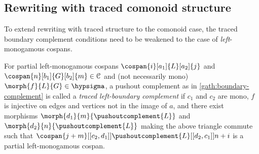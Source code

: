\subsection{Rewriting with traced comonoid structure}

To extend rewriting with traced structure to the comonoid case, the traced
boundary complement conditions need to be weakened to the case of
\emph{left}-monogamous cospans.

\begin{definition}
    \label{def:traced-left-boundary-complement}
    For partial left-monogamous cospans \(
        \cospan{i}[a_1]{L}[a_2]{j}
    \) and \(
        \cospan{n}[b_1]{G}[b_2]{m} \in \mathcal{C}
    \) and (not necessarily mono) \(
        \morph{f}{L}{G} \in \hypsigma
    \), a pushout complement as in \cref{gath:boundary-complement}
    is called a \emph{traced left-boundary complement} if \(c_1\) and \(c_2\)
    are mono, \(f\) is injective on edges and vertices not in the image of
    \(a\), and there exist morphisms \(
        \morph{d_1}{m}{\pushoutcomplement{L}}
    \) and \(
        \morph{d_2}{n}{\pushoutcomplement{L}}
    \) making the above triangle commute such that \(
        \cospan{j+m}[[c_2,d_1]]{\pushoutcomplement{L}}[[d_2,c_1]]{{n+i}}
    \) is a partial left-monogamous cospan.
\end{definition}